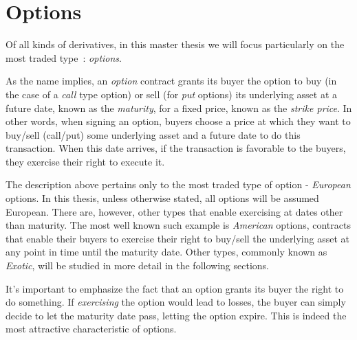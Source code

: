 \section{Options}
\label{section:options}
Of all kinds of derivatives, in this master thesis we will focus particularly on the most traded type~\cite{Hull}: \emph{options}.

As the name implies, an \emph{option} contract grants its buyer the option to buy (in the case of a \emph{call} type option) or sell (for \emph{put} options) its underlying asset at a future date, known as the \emph{maturity}, for a fixed price, known as the \emph{strike price}.
In other words, when signing an option, buyers choose a price at which they want to buy/sell (call/put) some underlying asset and a future date to do this transaction. When this date arrives, if the transaction is favorable to the buyers, they exercise their right to execute it.

The description above pertains only to the most traded type of option - \emph{European} options. In this thesis, unless otherwise stated, all options will be assumed European. There are, however, other types that enable exercising at dates other than maturity.
The most well known such example is \emph{American} options, contracts that enable their buyers to exercise their right to buy/sell the underlying asset at any point in time until the maturity date.
Other types, commonly known as \emph{Exotic}, will be studied in more detail in the following sections.


It's important to emphasize the fact that an option grants its buyer the right to do something. If \emph{exercising} the option would lead to losses, the buyer can simply decide to let the maturity date pass, letting the option expire. This is indeed the most attractive characteristic of options.


\iffalse
\subsection{European and American Options}
\label{subsection:european and american options}
Options are also categorized by the period at which the buyer is allowed to exercise his right. The two most traded types are European and American options.
With an European option, an investor is only able to exercise the contract at the expiration date. The value of the underlying asset up to that point in time is irrelevant.
As for American options, the buyer can exercise the contract at any moment up to the expiration date.
In this case, the investor is faced with an optimal-stopping problem: when is the best time to exercise the option?
For this very reason, it should be clear that American options are significantly more difficult to study than their European counterparts.
\fi

